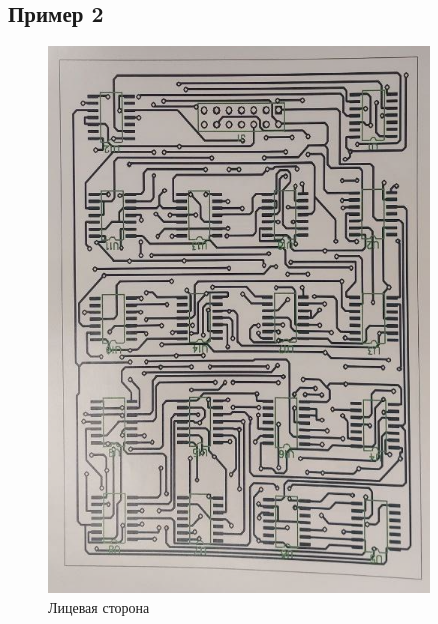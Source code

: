 \documentclass[a4paper, 12pt]{article}
\begin{document}
\subsection{Пример 2}
\begin{figure}[h!]
	\centering
	\includegraphics[angle=180,origin=c,width=0.9\textwidth]{docs/ex2.png}
	\caption{Лицевая сторона}
\end{figure}
\end{document}
